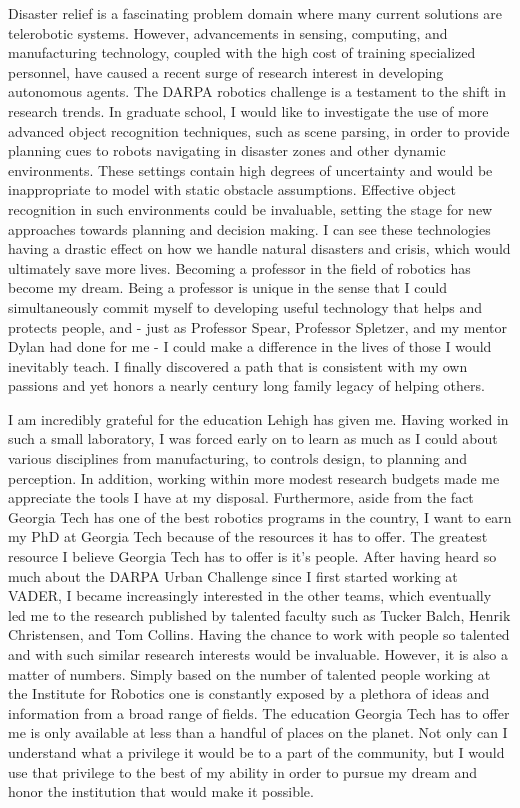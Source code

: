 Disaster relief is a fascinating problem domain where many current solutions
are telerobotic systems. However, advancements in sensing, computing, and
manufacturing technology, coupled with the high cost of training specialized
personnel, have caused a recent surge of research interest in developing
autonomous agents. The DARPA robotics challenge is a testament to the shift in
research trends. In graduate school, I would like to investigate the use of
more advanced object recognition techniques, such as scene parsing, in order to
provide planning cues to robots navigating in disaster zones and other dynamic
environments.  These settings contain high degrees of uncertainty and would be
inappropriate to model with static obstacle assumptions. Effective object
recognition in such environments could be invaluable, setting the stage for new
approaches towards planning and decision making. I can see these technologies
having a drastic effect on how we handle natural disasters and crisis, which
would ultimately save more lives. Becoming a professor in the field of robotics
has become my dream. Being a professor is unique in the sense that I could
simultaneously commit myself to developing useful technology that helps and
protects people, and - just as Professor Spear, Professor Spletzer, and my
mentor Dylan had done for me - I could make a difference in the lives of those
I would inevitably teach. I finally discovered a path that is consistent with
my own passions and yet honors a nearly century long family legacy of helping
others.

I am incredibly grateful for the education Lehigh has given me. Having worked
in such a small laboratory, I was forced early on to learn as much as I could
about various disciplines from manufacturing, to controls design, to planning
and perception. In addition, working within more modest research budgets made
me appreciate the tools I have at my disposal. Furthermore, aside from the fact
Georgia Tech has one of the best robotics programs in the country, I want to
earn my PhD at Georgia Tech because of the resources it has to offer. The
greatest resource I believe Georgia Tech has to offer is it's people. After
having heard so much about the DARPA Urban Challenge since I first started
working at VADER, I became increasingly interested in the other teams, which
eventually led me to the research published by talented faculty such as Tucker
Balch, Henrik Christensen, and Tom Collins. Having the chance to work with
people so talented and with such similar research interests would be
invaluable.  However, it is also a matter of numbers. Simply based on the
number of talented people working at the Institute for Robotics one is
constantly exposed by a plethora of ideas and information from a broad range of
fields. The education Georgia Tech has to offer me is only available at less
than a handful of places on the planet. Not only can I understand what a
privilege it would be to a part of the community, but I would use that
privilege to the best of my ability in order to pursue my dream and honor the
institution that would make it possible.
